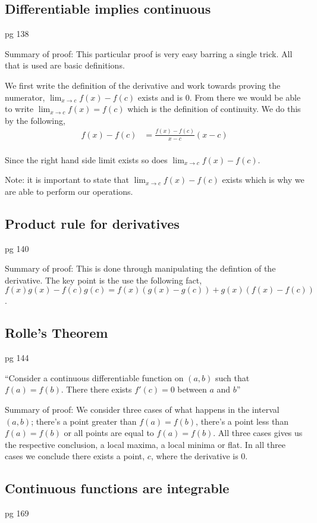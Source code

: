 \documentclass{article}
\begin{document}
\subsection{Differentiable implies continuous}
pg 138

Summary of proof: This particular proof is very easy barring a single trick.
All that is used are basic definitions.

We first write the definition of the derivative and work towards proving the
numerator, $\lim_{x \to c} f(x) - f(c)$ exists and is 0. From there we would
be able to write $\lim_{x \to c} f(x) = f(c)$ which is the definition of
continuity. We do this by the following,
\begin{align*}
    f(x) - f(c) &= \frac{f(x) - f(c)}{x - c} (x - c) \\
\end{align*}

Since the right hand side limit exists so does $\lim_{x \to c} f(x) - f(c)$.

Note: it is important to state that $\lim_{x \to c} f(x) - f(c)$ exists which
is why we are able to perform our operations.

\subsection{Product rule for derivatives}
pg 140

Summary of proof: This is done through manipulating the defintion of the
derivative. The key point is the use the following fact,
$f(x)g(x) - f(c)g(c) = f(x)(g(x) - g(c)) + g(x)(f(x) - f(c))$.

\subsection{Rolle's Theorem}
pg 144

``Consider a continuous differentiable function on $(a,b)$ such that
$f(a) = f(b)$. There there exists $f'(c) = 0$ between $a$ and $b$''

Summary of proof: We consider three cases of what happens in the interval
$(a,b)$; there's a point greater than $f(a)=f(b)$, there's a point less than
$f(a)=f(b)$ or all points are equal to $f(a)=f(b)$. All three cases gives us
the respective conclusion, a local maxima, a local minima or flat.
In all three cases we conclude there exists a point, $c$, where the
derivative is 0.

\subsection{Continuous functions are integrable}
pg 169
\end{document}
